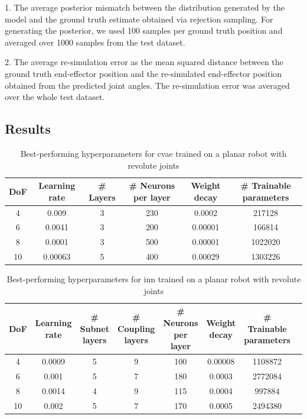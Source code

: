 \documentclass[conference]{IEEEtran}
\begin{document}
1. The average posterior mismatch between the distribution generated by the model and the ground truth estimate obtained via rejection sampling. For generating the posterior, we used 100 samples per ground truth position and averaged over 1000 samples from the test dataset.

2. The average re-simulation error as the mean squared distance between the ground truth end-effector position and the re-simulated end-effector position obtained from the predicted joint angles. The re-simulation error was averaged over the whole test dataset.

\subsection*{Results}

\begin{table}[h]
\caption{Best-performing hyperparameters for cvae trained on a planar robot with revolute joints}
\label{tab:results:cvae}
\centering
\begin{tabular}{|c|c|c|c|c|c|}
\hline
DoF & Learning rate & \# Layers & \# Neurons per layer & Weight decay & \# Trainable parameters \\
\hline
4  & 0.009 & 3 & 230 & 0.0002 & 217128 \\
6  & 0.0041 & 3 & 200 & 0.00001 & 166814 \\
8  & 0.0001 & 3 & 500 & 0.00001 & 1022020 \\
10  & 0.00063 & 5 & 400 & 0.00029 & 1303226 \\
\hline
\end{tabular}
\end{table}

\begin{table}[h]
\caption{Best-performing hyperparameters for inn trained on a planar robot with revolute joints}
\label{tab:results:inn}
\centering
\begin{tabular}{|c|c|c|c|c|c|c|c|}
\hline
DoF & Learning rate & \# Subnet layers & \# Coupling layers & \# Neurons per layer & Weight decay & \# Trainable parameters \\
\hline
4  & 0.0009 & 5 & 9 & 100 & 0.00008 & 1108872 \\
6  & 0.001 & 5 & 7 & 180 & 0.0003 & 2772084 \\
8  & 0.0014 & 4 & 9 & 115 & 0.0004 & 997884 \\
10  & 0.002 & 5 & 7 & 170 & 0.0005 & 2494380 \\
\hline
\end{tabular}
\end{table}
\end{document}

